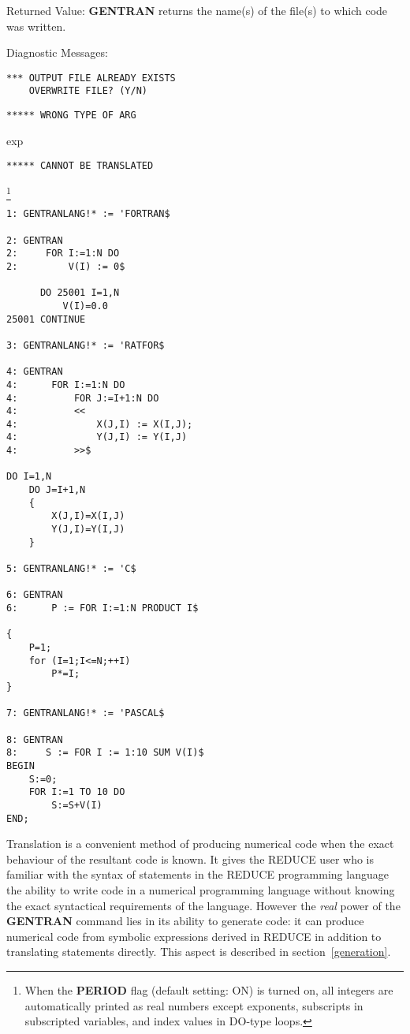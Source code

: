 \begin{describe}{Returned Value:}
{\bf GENTRAN}  returns the name(s) of the file(s) to which code was written.
\end{describe}
\begin{describe}{Diagnostic Messages:}
\begin{verbatim}
*** OUTPUT FILE ALREADY EXISTS
    OVERWRITE FILE? (Y/N)
\end{verbatim}
\begin{verbatim}
***** WRONG TYPE OF ARG
\end{verbatim}
exp
\begin{verbatim}
***** CANNOT BE TRANSLATED
\end{verbatim}
\end{describe}
\begin{describe}{\example\footnote{When the {\bf PERIOD} flag (default
setting: ON) is turned on, all 
integers are automatically printed as real numbers except exponents,
subscripts in subscripted variables, and index values in DO-type loops.}}
\begin{verbatim}
1: GENTRANLANG!* := 'FORTRAN$

2: GENTRAN
2:     FOR I:=1:N DO
2:         V(I) := 0$

      DO 25001 I=1,N
          V(I)=0.0
25001 CONTINUE

3: GENTRANLANG!* := 'RATFOR$

4: GENTRAN
4:      FOR I:=1:N DO
4:          FOR J:=I+1:N DO
4:          <<
4:              X(J,I) := X(I,J);
4:              Y(J,I) := Y(I,J)
4:          >>$

DO I=1,N
    DO J=I+1,N
    {
        X(J,I)=X(I,J)
        Y(J,I)=Y(I,J)
    }

5: GENTRANLANG!* := 'C$

6: GENTRAN
6:      P := FOR I:=1:N PRODUCT I$

{
    P=1;
    for (I=1;I<=N;++I)
        P*=I;
}

7: GENTRANLANG!* := 'PASCAL$

8: GENTRAN
8:     S := FOR I := 1:10 SUM V(I)$
BEGIN
    S:=0;
    FOR I:=1 TO 10 DO
        S:=S+V(I)
END;
\end{verbatim}
\end{describe}


 Translation is a convenient method of producing
numerical code when the exact behaviour of the resultant code is
known.  It gives the REDUCE user who is familiar with the syntax of
statements in the REDUCE programming language the ability to write
code in a numerical programming language without knowing the exact
syntactical requirements of the language.  However the {\em real}
power of the {\bf GENTRAN} command lies in its ability to generate
code: it can produce numerical code from symbolic expressions derived
in REDUCE in addition to translating statements directly.  This aspect
is described in section~\ref{generation}.

